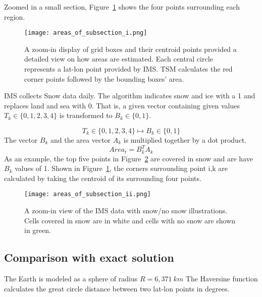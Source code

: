 Zoomed in a small section, Figure~\ref{fig:areas_section} shows the four points surrounding each region.

\begin{figure}[ht]
\centering
\begin{minipage}{6in}
\texttt{[image: areas\_of\_subsection\_i.png]}
\caption{A zoom-in display of grid boxes and their centroid points provided a detailed view on how areas are estimated. Each central circle represents a lat-lon point provided by IMS. TSM calculates the red corner points followed by the bounding boxes' area.}
\label{fig:areas_section}
\end{minipage}
\end{figure}

IMS collects Snow data daily. The algorithm indicates snow and ice with a 1 and replaces land and sea with 0. That is, a given vector containing given values $T_k \in \{0,1,2,3,4\}$ is transformed to $B_k \in \{0,1\}$.

\begin{equation}
T_k \in \{0,1,2,3,4\} \mapsto B_k \in \{0,1\}
\end{equation}
The vector $B_k$ and the area vector $A_k$ is multiplied together by a dot product.
\begin{equation}
Area_t  = B_k^{T}A_k
\end{equation}
As an example, the top five points in Figure~\ref{fig:areas_section_ii} are covered in snow and are have $B_k$ values of 1. Shown in Figure~\ref{fig:areas_section}, the corners surrounding point i,k are calculated by taking the centroid of its surrounding four points.

\begin{figure}[ht]
\centering
\begin{minipage}{6in}
\texttt{[image: areas\_of\_subsection\_ii.png]}
\caption{A zoom-in view of the IMS data with snow/no snow illustrations. Cells covered in snow are in white and cells with no snow are shown in green.}
\label{fig:areas_section_ii}
\end{minipage}
\end{figure}

\subsection{Comparison with exact solution}

The Earth is modeled as a sphere of radius $R = 6,371 \ km$ The Haversine function calculates the great circle distance between two lat-lon points in degrees.

